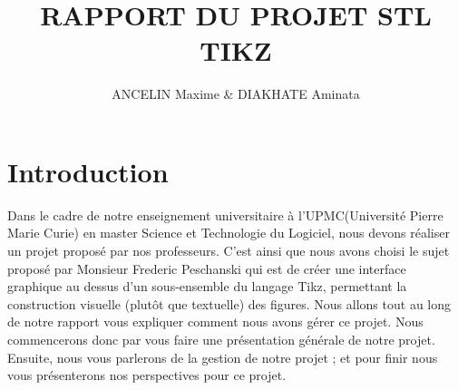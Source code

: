 \documentclass[a4paper]{report}
\title{RAPPORT DU PROJET STL \\ TIKZ}
\author{ANCELIN Maxime & DIAKHATE Aminata}
\begin{document}
 

\newenvironment{violetpar}{\color{violet}}{}
\newenvironment{bluepar}{\par\color{blue}}{\par}
\newenvironment{yellowpar}{\par\color{orange}}{\par}

\renewcommand{\labelitemi}{$\bullet$}

\setcounter{tocdepth}{3}

\maketitle
\tableofcontents
\newpage

\titleformat{\chapter}[hang]{\bf\huge}{\thechapter}{2pc}{} 


\newpage
 \chapter{Introduction}
  Dans le cadre de notre enseignement universitaire à l'UPMC(Université Pierre Marie Curie) en master Science et Technologie du Logiciel, nous devons réaliser un projet proposé par nos professeurs. C'est ainsi que nous avons choisi le sujet proposé par Monsieur Frederic Peschanski qui est de créer une interface graphique au dessus d'un sous-ensemble du langage Tikz, permettant la construction visuelle (plutôt que textuelle) des figures. 
  \newline
  Nous allons tout au long de notre rapport vous expliquer comment nous avons gérer ce projet. Nous commencerons donc par vous faire une présentation générale de notre projet. Ensuite, nous vous parlerons de la gestion de notre projet ; et pour finir nous vous présenterons nos perspectives pour ce projet.
  
\end{document}
